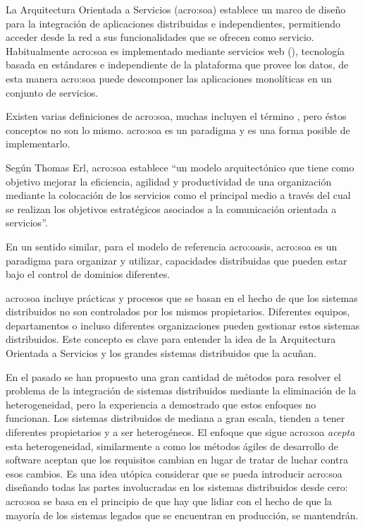 La Arquitectura Orientada a Servicios (\gls{acro:soa}) establece un marco de diseño para la integración de aplicaciones distribuidas e independientes, permitiendo acceder desde la red a sus funcionalidades que se ofrecen como servicio. Habitualmente \gls{acro:soa} es implementado mediante servicios web (), tecnología basada en estándares e independiente de la plataforma que provee los datos, de esta manera \gls{acro:soa} puede descomponer las aplicaciones monolíticas en un conjunto de servicios\cite{microsoft2006}.

Existen varias definiciones de \gls{acro:soa}, muchas incluyen el término , pero éstos conceptos no son lo mismo. \gls{acro:soa} es un paradigma y  es una forma posible de implementarlo.

Según Thomas Erl\cite{principlesofdesign:erl}, \gls{acro:soa} establece ``un modelo arquitectónico que tiene como objetivo mejorar la eficiencia, agilidad y productividad de una organización mediante la colocación de los servicios como el principal medio a través del cual se realizan los objetivos estratégicos asociados a la comunicación orientada a servicios''.

En un sentido similar, para el modelo de referencia \gls{acro:oasis}, \gls{acro:soa} es un paradigma para organizar y utilizar, capacidades distribuidas que pueden estar bajo el control de dominios diferentes.

\gls{acro:soa} incluye prácticas y procesos que se basan en el hecho de que los sistemas distribuidos no son controlados por los mismos propietarios. Diferentes equipos, departamentos o incluso diferentes organizaciones pueden gestionar estos sistemas distribuidos. Este concepto es clave para entender la idea de la Arquitectura Orientada a Servicios y los grandes sistemas distribuidos que la acuñan.

En el pasado se han propuesto una gran cantidad de métodos para resolver el problema de la integración de sistemas distribuidos mediante la eliminación de la heterogeneidad, pero la experiencia a demostrado que estos enfoques no funcionan.\cite[p.~14]{josuttis2007} Los sistemas distribuidos de mediana a gran escala, tienden a tener diferentes propietarios y a ser heterogéneos. El enfoque que sigue \gls{acro:soa} \textit{acepta} esta heterogeneidad, similarmente a como los métodos ágiles de desarrollo de software aceptan que los requisitos cambian en lugar de tratar de luchar contra esos cambios. Es una idea utópica considerar que se pueda introducir \gls{acro:soa} diseñando todas las partes involucradas en los sistemas distribuidos desde cero: \gls{acro:soa} se basa en el principio de que hay que lidiar con el hecho de que la mayoría de los sistemas legados que se encuentran en producción, se mantendrán.\cite[p.~15]{josuttis2007}

